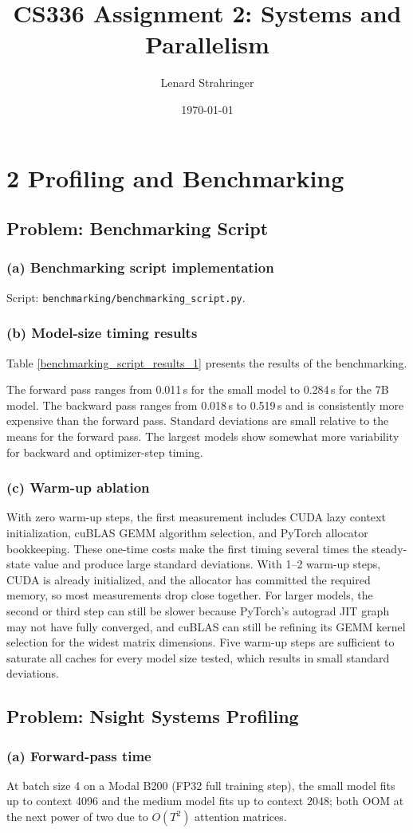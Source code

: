 \documentclass[11pt]{article}
\title{CS336 Assignment 2: Systems and Parallelism}
\author{Lenard Strahringer}
\date{\today}
\newcommand{\question}[1]{\subsection*{#1}}
\newcommand{\subquestion}[1]{\subsubsection*{#1}}
\begin{document}
\maketitle

\section*{2 Profiling and Benchmarking}

\question{Problem: Benchmarking Script}
\subquestion{(a) Benchmarking script implementation}
Script: \texttt{benchmarking/benchmarking\_script.py}. 

\subquestion{(b) Model-size timing results}
Table \ref{benchmarking_script_results_1} presents the results of the benchmarking. 

\begin{table}[H]
  \centering
  
  \caption{Mean and standard deviation of forward, backward, and optimizer-step timings in seconds on a Modal B200, using batch size 4, context length 256, 5 warm-up steps, 10 measurement steps, and bfloat16 weights.}
  \label{benchmarking_script_results_1}
\end{table}

The forward pass ranges from 0.011\,s for the small model to 0.284\,s for the 7B model. The backward pass ranges from 0.018\,s to 0.519\,s and is consistently more expensive than the forward pass. Standard deviations are small relative to the means for the forward pass. The largest models show somewhat more variability for backward and optimizer-step timing.

\subquestion{(c) Warm-up ablation}
With zero warm-up steps, the first measurement includes CUDA lazy context initialization, cuBLAS GEMM algorithm selection, and PyTorch allocator bookkeeping. These one-time costs make the first timing several times the steady-state value and produce large standard deviations. With 1--2 warm-up steps, CUDA is already initialized, and the allocator has committed the required memory, so most measurements drop close together. For larger models, the second or third step can still be slower because PyTorch's autograd JIT graph may not have fully converged, and cuBLAS can still be refining its GEMM kernel selection for the widest matrix dimensions. Five warm-up steps are sufficient to saturate all caches for every model size tested, which results in small standard deviations.

\question{Problem: Nsight Systems Profiling}
\subquestion{(a) Forward-pass time}
At batch size 4 on a Modal B200 (FP32 full training step), the small model fits up to context 4096 and the medium model fits up to context 2048; both OOM at the next power of two due to $O(T^2)$ attention matrices.
\end{document}
